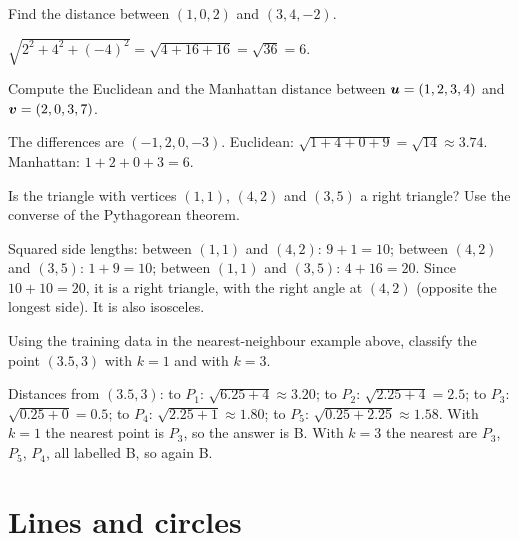 \begin{exercise}
Find the distance between $(1, 0, 2)$ and $(3, 4, -2)$.
\end{exercise}
\begin{solution}
$\sqrt{2^2 + 4^2 + (-4)^2} = \sqrt{4 + 16 + 16} = \sqrt{36} = 6$.
\end{solution}

\begin{exercise}
Compute the Euclidean and the Manhattan distance between
$\bm{u} = (1, 2, 3, 4)$ and $\bm{v} = (2, 0, 3, 7)$.
\end{exercise}
\begin{solution}
The differences are $(-1, 2, 0, -3)$. Euclidean:
$\sqrt{1 + 4 + 0 + 9} = \sqrt{14} \approx 3.74$. Manhattan:
$1 + 2 + 0 + 3 = 6$.
\end{solution}

\begin{exercise}
Is the triangle with vertices $(1, 1)$, $(4, 2)$ and $(3, 5)$ a right
triangle? Use the converse of the Pythagorean theorem.
\end{exercise}
\begin{solution}
Squared side lengths: between $(1,1)$ and $(4,2)$: $9 + 1 = 10$; between
$(4,2)$ and $(3,5)$: $1 + 9 = 10$; between $(1,1)$ and $(3,5)$:
$4 + 16 = 20$. Since $10 + 10 = 20$, it is a right triangle, with the right
angle at $(4, 2)$ (opposite the longest side). It is also isosceles.
\end{solution}

\begin{exercise}
Using the training data in the nearest-neighbour example above, classify the
point $(3.5, 3)$ with $k = 1$ and with $k = 3$.
\end{exercise}
\begin{solution}
Distances from $(3.5, 3)$: to $P_1$: $\sqrt{6.25 + 4} \approx 3.20$; to $P_2$:
$\sqrt{2.25 + 4} = 2.5$; to $P_3$: $\sqrt{0.25 + 0} = 0.5$; to $P_4$:
$\sqrt{2.25 + 1} \approx 1.80$; to $P_5$: $\sqrt{0.25 + 2.25} \approx 1.58$.
With $k = 1$ the nearest point is $P_3$, so the answer is B. With $k = 3$ the
nearest are $P_3$, $P_5$, $P_4$, all labelled B, so again B.
\end{solution}

\section{Lines and circles}\label{sec:lines-circles}

